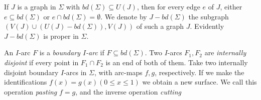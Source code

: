 If $J$ is a graph in $\Sigma$ with $bd(\Sigma) \subseteq U(J)$, then for every edge $e$ of $J$, either $e \subseteq bd(\Sigma)$ or $e \cap bd(\Sigma) = \emptyset$. We denote by $J - bd(\Sigma)$ the subgraph $(V(J) \cup (U(J) - bd(\Sigma)), V(J))$ of such a graph $J$. Evidently $J - bd(\Sigma)$ is proper in $\Sigma$.

An $I$-arc $F$ is a \textit{boundary $I$-arc} if $F \subseteq bd(\Sigma)$. Two $I$-arcs $F_1, F_2$ are \textit{internally disjoint} if every point in $F_1 \cap F_2$ is an end of both of them. Take two internally disjoint boundary $I$-arcs in $\Sigma$, with arc-maps $f, g$, respectively. If we make the identifications $f(x) = g(x) (0 \le x \le 1)$ we obtain a new surface. We call this operation \textit{pasting} $f = g$, and the inverse operation \textit{cutting}
